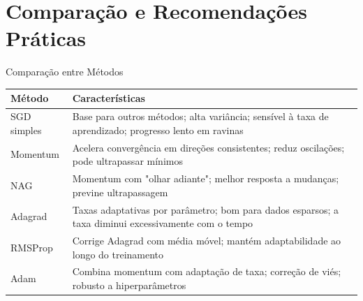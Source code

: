 \documentclass[aspectratio=1610]{beamer}
\begin{document}

\section{Comparação e Recomendações Práticas}

\begin{frame}{Comparação entre Métodos}
\small
\begin{tabular}{|p{2cm}|p{8cm}|}
\hline
\textbf{Método} & \textbf{Características} \\
\hline
SGD simples & Base para outros métodos; alta variância; sensível à taxa de aprendizado; progresso lento em ravinas \\
\hline
Momentum & Acelera convergência em direções consistentes; reduz oscilações; pode ultrapassar mínimos \\
\hline
NAG & Momentum com "olhar adiante"; melhor resposta a mudanças; previne ultrapassagem \\
\hline
Adagrad & Taxas adaptativas por parâmetro; bom para dados esparsos; a taxa diminui excessivamente com o tempo \\
\hline
RMSProp & Corrige Adagrad com média móvel; mantém adaptabilidade ao longo do treinamento \\
\hline
Adam & Combina momentum com adaptação de taxa; correção de viés; robusto a hiperparâmetros \\
\hline
\end{tabular}
\end{frame}
\end{document}
